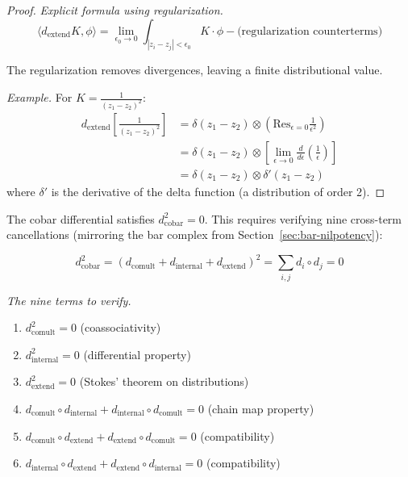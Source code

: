 \begin{proof}
\emph{Explicit formula using regularization.}
\[\langle d_{\text{extend}}K, \phi \rangle = \lim_{\epsilon_0 \to 0} \int_{|z_i - z_j| 
< \epsilon_0} K \cdot \phi - \text{(regularization counterterms)}\]

The regularization removes divergences, leaving a finite distributional value.

\emph{Example.} For $K = \frac{1}{(z_1 - z_2)^2}$:
\begin{align*}
d_{\text{extend}}\left[\frac{1}{(z_1 - z_2)^2}\right] &= 
\delta(z_1 - z_2) \otimes \left(\text{Res}_{\epsilon=0}\frac{1}{\epsilon^2}\right) \\
&= \delta(z_1 - z_2) \otimes \left[\lim_{\epsilon \to 0} \frac{d}{d\epsilon}\left(
\frac{1}{\epsilon}\right)\right] \\
&= \delta(z_1 - z_2) \otimes \delta'(z_1 - z_2)
\end{align*}
where $\delta'$ is the derivative of the delta function (a distribution of order 2).
\end{proof}

\begin{theorem}[Verification of \texorpdfstring{$d_{\text{cobar}}^2 = 0$}{d\_cobar\textasciicircum 2 = 0}; \ClaimStatusProvedHere]\label{thm:cobar-d-squared-zero}
The cobar differential satisfies $d_{\text{cobar}}^2 = 0$. This requires verifying 
nine cross-term cancellations (mirroring the bar complex from Section~\ref{sec:bar-nilpotency}):

\[d_{\text{cobar}}^2 = (d_{\text{comult}} + d_{\text{internal}} + d_{\text{extend}})^2 
= \sum_{i,j} d_i \circ d_j = 0\]

\emph{The nine terms to verify.}
\begin{enumerate}
\item $d_{\text{comult}}^2 = 0$ (coassociativity)
\item $d_{\text{internal}}^2 = 0$ (differential property)
\item $d_{\text{extend}}^2 = 0$ (Stokes' theorem on distributions)
\item $d_{\text{comult}} \circ d_{\text{internal}} + d_{\text{internal}} \circ 
d_{\text{comult}} = 0$ (chain map property)
\item $d_{\text{comult}} \circ d_{\text{extend}} + d_{\text{extend}} \circ 
d_{\text{comult}} = 0$ (compatibility)
\item $d_{\text{internal}} \circ d_{\text{extend}} + d_{\text{extend}} \circ 
d_{\text{internal}} = 0$ (compatibility)
\end{enumerate}
\end{theorem}


